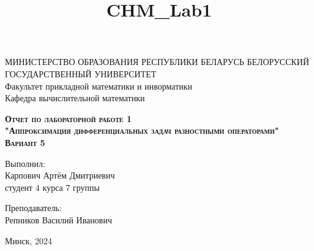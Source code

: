 \documentclass[11pt]{article}
\title{CHM\_Lab1}
\begin{document}
    
    \begin{titlepage}
    \newpage
    
    \begin{center}
    МИНИСТЕРСТВО ОБРАЗОВАНИЯ РЕСПУБЛИКИ БЕЛАРУСЬ БЕЛОРУССКИЙ ГОСУДАРСТВЕННЫЙ УНИВЕРСИТЕТ \\
    Факультет прикладной математики и инворматики \\ Кафедра вычислительной математики
 
    \end{center}
    
    \vspace{8em}
    
    \vspace{2em}
    
    \begin{center}
    \textsc{\textbf{Отчет по лабораторной работе 1 \\ "Аппроксимация дифференциальных задач разностными операторами" \linebreak Вариант 5}}
    \end{center}
    
    \vspace{6em}
    
    \begin{flushright}
        Выполнил:\\
        Карпович Артём Дмитриевич\\
        студент 4 курса 7 группы
    \end{flushright}
    
    \begin{flushright}
        Преподаватель:\\
        Репников Василий Иванович
    \end{flushright}
    
    \vspace{\fill}
    
    \vspace{\fill}
    
    \begin{center}
    Минск, 2024
    \end{center}
    
    \end{titlepage}
    
\end{document}

